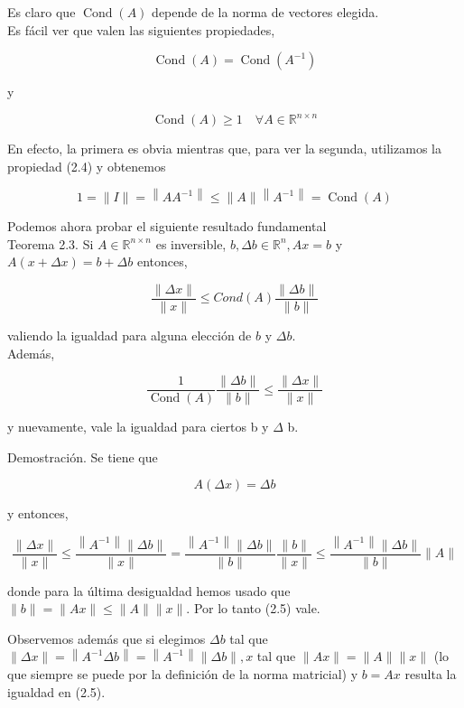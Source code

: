\documentclass[10pt]{book}
\begin{document}
Es claro que $\operatorname{Cond}(A)$ depende de la norma de vectores elegida.\\
Es fácil ver que valen las siguientes propiedades,

$$
\operatorname{Cond}(A)=\operatorname{Cond}\left(A^{-1}\right)
$$

y

$$
\operatorname{Cond}(A) \geq 1 \quad \forall A \in \mathbb{R}^{n \times n}
$$

En efecto, la primera es obvia mientras que, para ver la segunda, utilizamos la propiedad (2.4) y obtenemos

$$
1=\|I\|=\left\|A A^{-1}\right\| \leq\|A\|\left\|A^{-1}\right\|=\operatorname{Cond}(A)
$$

Podemos ahora probar el siguiente resultado fundamental\\
Teorema 2.3. Si $A \in \mathbb{R}^{n \times n}$ es inversible, $b, \Delta b \in \mathbb{R}^{n}, A x=b$ y $A(x+\Delta x)=b+\Delta b$ entonces,


\begin{equation*}
\frac{\|\Delta x\|}{\|x\|} \leq C o n d(A) \frac{\|\Delta b\|}{\|b\|} \tag{2.5}
\end{equation*}


valiendo la igualdad para alguna elección de $b$ y $\Delta b$.\\
Además,


\begin{equation*}
\frac{1}{\operatorname{Cond}(A)} \frac{\|\Delta b\|}{\|b\|} \leq \frac{\|\Delta x\|}{\|x\|} \tag{2.6}
\end{equation*}


y nuevamente, vale la igualdad para ciertos b y $\Delta$ b.

Demostración. Se tiene que

$$
A(\Delta x)=\Delta b
$$

y entonces,

$$
\frac{\|\Delta x\|}{\|x\|} \leq \frac{\left\|A^{-1}\right\|\|\Delta b\|}{\|x\|}=\frac{\left\|A^{-1}\right\|\|\Delta b\|}{\|b\|} \frac{\|b\|}{\|x\|} \leq \frac{\left\|A^{-1}\right\|\|\Delta b\|}{\|b\|}\|A\|
$$

donde para la última desigualdad hemos usado que $\|b\|=\|A x\| \leq\|A\|\|x\|$. Por lo tanto (2.5) vale.

Observemos además que si elegimos $\Delta b$ tal que $\|\Delta x\|=\left\|A^{-1} \Delta b\right\|=\left\|A^{-1}\right\|\|\Delta b\|, x$ tal que $\|A x\|=\|A\|\|x\|$ (lo que siempre se puede por la definición de la norma matricial) y $b=A x$ resulta la igualdad en (2.5).
\end{document}
